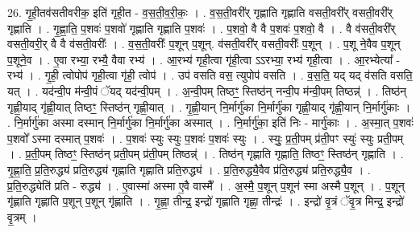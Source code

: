 \documentclass[17pt]{extarticle}
\begin{document}
26. गृ॒ही॒तव॑सतीवरीक॒ इति॑ गृही॒त - व॒स॒ती॒व॒री॒कः॒ । . व॒स॒ती॒वरी᳚र् गृह्णाति गृह्णाति वसती॒वरी᳚र् वसती॒वरी᳚र् गृह्णाति । . गृ॒ह्णा॒ति॒ प॒शवः॑ प॒शवो॑ गृह्णाति गृह्णाति प॒शवः॑ । . प॒शवो॒ वै वै प॒शवः॑ प॒शवो॒ वै । . वै व॑सती॒वरी᳚र् वसती॒वरी॒र् वै वै व॑सती॒वरीः᳚ । . व॒स॒ती॒वरीः᳚ प॒शून् प॒शून्. व॑सती॒वरी᳚र् वसती॒वरीः᳚ प॒शून् । . प॒शू ने॒वैव प॒शून् प॒शूने॒व । . ए॒वा रभ्या॒ रभ्यै॒ वैवा रभ्य॑ । . आ॒रभ्य॑ गृही॒त्वा गृ॑ही॒त्वा ऽऽरभ्या॒ रभ्य॑ गृही॒त्वा । . आ॒रभ्येत्या᳚ - रभ्य॑ । . गृ॒ही॒ त्वोपोप॑ गृही॒त्वा गृ॑ही॒ त्वोप॑ । . उप॑ वसति वस॒ त्युपोप॑ वसति । . व॒स॒ति॒ यद् यद् व॑सति वसति॒ यत् । . यद॑न्वी॒प म॑न्वी॒पं ॅयद् यद॑न्वी॒पम् । . अ॒न्वी॒पम् तिष्ठꣳ॒॒ स्तिष्ठ॑न् नन्वी॒प म॑न्वी॒पम् तिष्ठन्न्॑ । . तिष्ठ॑न् गृह्णी॒याद् गृ॑ह्णी॒यात् तिष्ठꣳ॒॒ स्तिष्ठ॑न् गृह्णी॒यात् । . गृ॒ह्णी॒यान् नि॒र्मार्गु॑का नि॒र्मार्गु॑का गृह्णी॒याद् गृ॑ह्णी॒यान् नि॒र्मार्गु॑काः । . नि॒र्मार्गु॑का अस्मा दस्मान् नि॒र्मार्गु॑का नि॒र्मार्गु॑का अस्मात् । . नि॒र्मार्गु॑का॒ इति॑ निः - मार्गु॑काः । . अ॒स्मा॒त् प॒शवः॑ प॒शवो᳚ ऽस्मा दस्मात् प॒शवः॑ । . प॒शवः॑ स्युः स्युः प॒शवः॑ प॒शवः॑ स्युः । . स्युः॒ प्र॒ती॒पम् प्र॑ती॒पꣳ स्युः॑ स्युः प्रती॒पम् । . प्र॒ती॒पम् तिष्ठꣳ॒॒ स्तिष्ठ॑न् प्रती॒पम् प्र॑ती॒पम् तिष्ठन्न्॑ । . तिष्ठ॑न् गृह्णाति गृह्णाति॒ तिष्ठꣳ॒॒ स्तिष्ठ॑न् गृह्णाति । . गृ॒ह्णा॒ति॒ प्र॒ति॒रुद्ध्य॑ प्रति॒रुद्ध्य॑ गृह्णाति गृह्णाति प्रति॒रुद्ध्य॑ । . प्र॒ति॒रुद्ध्यै॒वैव प्र॑ति॒रुद्ध्य॑ प्रति॒रुद्ध्यै॒व । . प्र॒ति॒रुद्ध्येति॑ प्रति - रुद्ध्य॑ । . ए॒वास्मा॑ अस्मा ए॒वै वास्मै᳚ । . अ॒स्मै॒ प॒शून् प॒शून॑ स्मा अस्मै प॒शून् । . प॒शून् गृ॑ह्णाति गृह्णाति प॒शून् प॒शून् गृ॑ह्णाति । . गृ॒ह्णा॒ तीन्द्र॒ इन्द्रो॑ गृह्णाति गृह्णा॒ तीन्द्रः॑ । . इन्द्रो॑ वृ॒त्रं ॅवृ॒त्र मिन्द्र॒ इन्द्रो॑ वृ॒त्रम् । \newline
\end{document}
